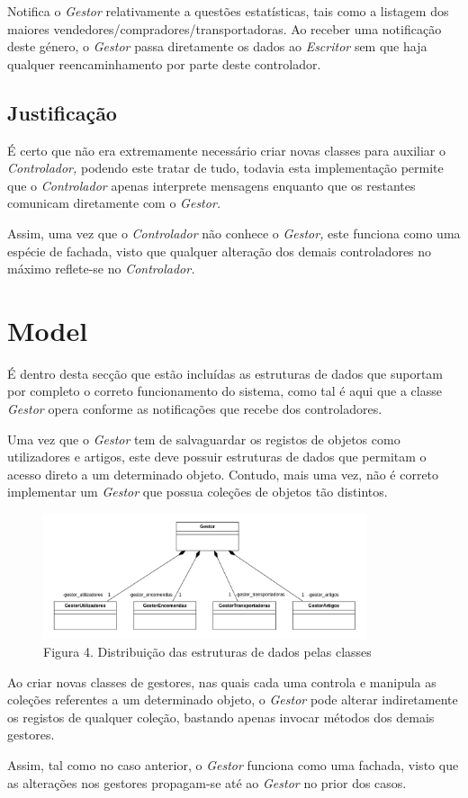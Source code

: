     Notifica o \textit{Gestor} relativamente a questões estatísticas, tais como a listagem dos maiores vendedores/compradores/transportadoras. Ao receber uma notificação deste género, o \textit{Gestor} passa diretamente os dados ao \textit{Escritor} sem que haja qualquer reencaminhamento por parte deste controlador.

    \vspace*{-5pt}
    \subsection{Justificação}

    É certo que não era extremamente necessário criar novas classes para auxiliar o \textit{Controlador,} podendo este tratar de tudo, todavia esta implementação permite que o \textit{Controlador} apenas interprete mensagens enquanto que os restantes comunicam diretamente com o \textit{Gestor.}
    
    Assim, uma vez que o \textit{Controlador} não conhece o \textit{Gestor,} este funciona como uma espécie de fachada, visto que qualquer alteração dos demais controladores no máximo reflete-se no \textit{Controlador.}

    \newpage
    \section{Model}

    É dentro desta secção que estão incluídas as estruturas de dados que suportam por completo o correto funcionamento do sistema, como tal é aqui que a classe \textit{Gestor} opera conforme as notificações que recebe dos controladores.

    Uma vez que o \textit{Gestor} tem de salvaguardar os registos de objetos como utilizadores e artigos, este deve possuir estruturas de dados que permitam o acesso direto a um determinado objeto. Contudo, mais uma vez, não é correto implementar um \textit{Gestor} que possua coleções de objetos tão distintos.

    \begin{figure}[hb!]
        \centering
        \includegraphics[width=0.85\textwidth]{imagens/6.png}
        \caption*{Figura 4. Distribuição das estruturas de dados pelas classes}
    \end{figure}

    Ao criar novas classes de gestores, nas quais cada uma controla e manipula as coleções referentes a um determinado objeto, o \textit{Gestor} pode alterar indiretamente os registos de qualquer coleção, bastando apenas invocar métodos dos demais gestores.

    Assim, tal como no caso anterior, o \textit{Gestor} funciona como uma fachada, visto que as alterações nos gestores propagam-se até ao \textit{Gestor} no prior dos casos.